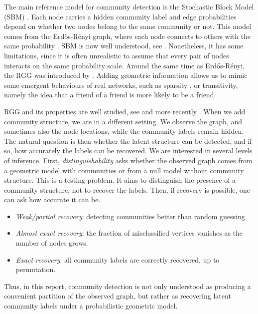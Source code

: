 \documentclass[runningheads]{llncs}
\begin{document}
The main reference model for community detection is the Stochastic Block Model (SBM)
\citep{holland1983stochastic}. Each node carries a hidden community label and edge probabilities depend on whether two nodes belong to the same community or not.
This model comes from the Erd\H{o}s-R\'enyi graph, where each node connects to others with the same probability \citep{erdHos1960evolution}. SBM is now well understood,
see \citep{abbe2018community}. Nonetheless, it has some limitations, since it is often unrealistic to assume that every pair of nodes interacts on the same probability scale.
Around the same time as Erd\H{o}s-R\'enyi, the RGG was introduced by \citep{gilbert1961random}.
Adding geometric information allows us to mimic some emergent behaviours of real networks,
such as sparsity \citep{Del_Genio_2011},
or transitivity, namely the idea that a friend of a friend is more likely to be a friend.


RGG and its properties are well studied, see \citep{penrose2003random} and more recently \citep{duchemin2023random}.
When we add community structure, we are in a different setting.
We observe the graph, and sometimes also the node locations,
while the community labels remain hidden. 
The natural question is then whether the latent structure can be detected, and if so, how accurately the labels can be recovered.
We are interested in several levels of inference.
First, \textit{distinguishability} asks whether the observed graph comes from a geometric model with communities or from a null model without community structure. This is a testing problem. It aims to distinguish the presence of a community structure, not to recover the labels. Then, if recovery is possible, one can ask how accurate it can be.
\begin{itemize}
    \item \textit{Weak/partial recovery}: detecting communities better than random guessing
    \item \textit{Almost exact recovery}: the fraction of misclassified vertices vanishes as the number of nodes grows.
    \item \textit{Exact recovery}: all community labels are correctly recovered, up to permutation.
\end{itemize}
Thus, in this report, community detection is not only understood as
producing a convenient partition of the observed graph, but rather as
recovering latent community labels under a probabilistic geometric model.
\end{document}
